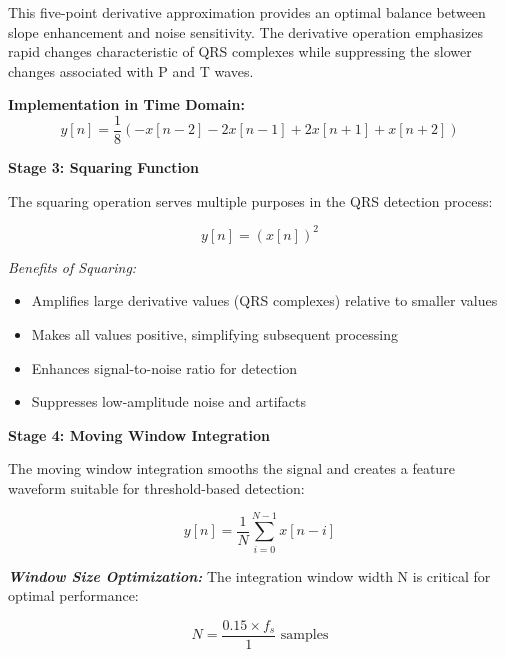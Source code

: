 \documentclass[12pt,a4paper]{article}
\begin{document}
This five-point derivative approximation provides an optimal balance between slope enhancement and noise sensitivity. The derivative operation emphasizes rapid changes characteristic of QRS complexes while suppressing the slower changes associated with P and T waves.

\vspace{0.3cm}

\textbf{Implementation in Time Domain:}
\begin{equation*}
y[n] = \frac{1}{8}(-x[n-2] - 2x[n-1] + 2x[n+1] + x[n+2])
\end{equation*}

\vspace{0.5cm}

\textbf{Stage 3: Squaring Function}

The squaring operation serves multiple purposes in the QRS detection process:

\begin{equation*}
y[n] = (x[n])^2
\end{equation*}

\textit{Benefits of Squaring:}
\begin{itemize}
\item Amplifies large derivative values (QRS complexes) relative to smaller values
\item Makes all values positive, simplifying subsequent processing
\item Enhances signal-to-noise ratio for detection
\item Suppresses low-amplitude noise and artifacts
\end{itemize}

\vspace{0.5cm}

\textbf{Stage 4: Moving Window Integration}

The moving window integration smooths the signal and creates a feature waveform suitable for threshold-based detection:

\begin{equation*}
y[n] = \frac{1}{N}\sum_{i=0}^{N-1}x[n-i]
\end{equation*}

\textbf{\textit{Window Size Optimization:}}
The integration window width N is critical for optimal performance:

\begin{equation*}
N = \frac{0.15 \times f_s}{1} \text{ samples}
\end{equation*}
\end{document}
